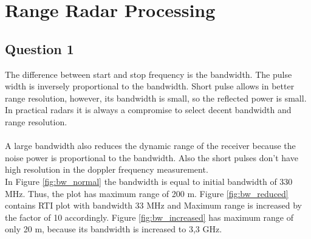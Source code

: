 \documentclass{article}
\begin{document}

\section{Range Radar Processing}

\subsection{Question 1}

The difference between start and stop frequency is the bandwidth. The pulse width is inversely proportional to the bandwidth. Short pulse allows in better range resolution, however, its bandwidth is small, so the reflected power is small. In practical radars it is always a compromise to select decent bandwidth and range resolution.\\
\\
A large bandwidth also reduces the dynamic range of the receiver because the noise power is proportional to the bandwidth. Also the short pulses don't have high resolution in the doppler frequency measurement. \cite{Skolnik:2001irs}\\

In Figure \ref{fig:bw_normal} the bandwidth is equal to initial bandwidth of 330 MHz. Thus, the plot has maximum range of 200 m. Figure \ref{fig:bw_reduced} contains RTI plot with bandwidth 33 MHz and Maximum range is increased by the factor of 10 accordingly. Figure \ref{fig:bw_increased} has maximum range of only 20 m, because its bandwidth is increased to 3,3 GHz.
\end{document}
